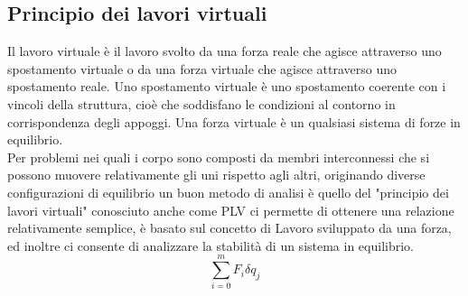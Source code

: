 \subsection{Principio dei lavori virtuali}
Il lavoro virtuale è il lavoro svolto da una forza reale che agisce attraverso uno spostamento virtuale o da una forza virtuale che agisce attraverso uno spostamento reale.
Uno spostamento virtuale è uno spostamento coerente con i vincoli della struttura, cioè che soddisfano le condizioni al contorno in corrispondenza degli appoggi.
Una forza virtuale è un qualsiasi sistema di forze in equilibrio.
\\Per problemi nei quali i corpo sono composti da membri interconnessi che si possono muovere relativamente gli uni rispetto agli altri, originando diverse configurazioni di equilibrio un buon metodo di analisi è quello del "principio dei lavori virtuali" conosciuto anche come PLV ci permette di ottenere una relazione relativamente semplice, è basato sul concetto di Lavoro sviluppato da una forza, ed inoltre ci consente di analizzare la stabilità di un sistema in equilibrio.
\begin{equation}
    \sum_{i=0}^m F_i\delta q_j\label{eq:din}
\end{equation}
